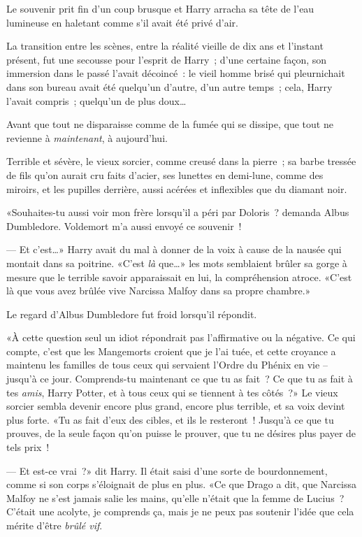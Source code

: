 \later

Le souvenir prit fin d'un coup brusque et Harry arracha sa tête de l'eau lumineuse en haletant comme s'il avait été privé d'air.

La transition entre les scènes, entre la réalité vieille de dix ans et l'instant présent, fut une secousse pour l'esprit de Harry~; d'une certaine façon, son immersion dans le passé l'avait décoincé~: le vieil homme brisé qui pleurnichait dans son bureau avait été quelqu'un d'autre, d'un autre temps~; cela, Harry l'avait compris~; quelqu'un de plus doux…

Avant que tout ne disparaisse comme de la fumée qui se dissipe, que tout ne revienne à \emph{maintenant}, à aujourd'hui.

Terrible et sévère, le vieux sorcier, comme creusé dans la pierre~; sa barbe tressée de fils qu'on aurait cru faits d'acier, ses lunettes en demi-lune, comme des miroirs, et les pupilles derrière, aussi acérées et inflexibles que du diamant noir.

«Souhaites-tu aussi voir mon frère lorsqu'il a péri par Doloris~? demanda Albus Dumbledore. Voldemort m'a aussi envoyé ce souvenir~!

--- Et c'est…» Harry avait du mal à donner de la voix à cause de la nausée qui montait dans sa poitrine. «C'est \emph{là} que…» les mots semblaient brûler sa gorge à mesure que le terrible savoir apparaissait en lui, la compréhension atroce. «C'est là que vous avez brûlée vive Narcissa Malfoy dans sa propre chambre.»

Le regard d'Albus Dumbledore fut froid lorsqu'il répondit.

«À cette question seul un idiot répondrait pas l'affirmative ou la négative. Ce qui compte, c'est que les Mangemorts croient que je l'ai tuée, et cette croyance a maintenu les familles de tous ceux qui servaient l'Ordre du Phénix en vie -- jusqu'à ce jour. Comprends-tu maintenant ce que tu as fait~? Ce que tu as fait à tes \emph{amis}, Harry Potter, et à tous ceux qui se tiennent à tes côtés~?» Le vieux sorcier sembla devenir encore plus grand, encore plus terrible, et sa voix devint plus forte. «Tu as fait d'eux des cibles, et ils le resteront~! Jusqu'à ce que tu prouves, de la seule façon qu'on puisse le prouver, que tu ne désires plus payer de tels prix~!

--- Et est-ce vrai~?» dit Harry. Il était saisi d'une sorte de bourdonnement, comme si son corps s'éloignait de plus en plus. «Ce que Drago a dit, que Narcissa Malfoy ne s'est jamais salie les mains, qu'elle n'était que la femme de Lucius~? C'était une acolyte, je comprends ça, mais je ne peux pas soutenir l'idée que cela mérite d'être \emph{brûlé vif}.

